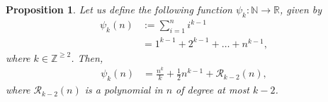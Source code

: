 \documentclass[11pt,lettersize,reqno,fullpage]{amsart}
\newtheorem{prp}[thm]{Proposition}
\begin{document}
\begin{prp}
\label{psi_k}
Let us define the following function
$\psi_k: \mathbb{N}\longrightarrow \mathbb{R}$, given by   
\begin{align} 
\psi_k(n)&:= \sum_{i=1}^{n} i^{k-1} \nonumber \\ 
          & = 1^{k-1} + 2^{k-1} + \ldots + n^{k-1},   
\end{align} 
where $k \in \mathbb{Z}^{\geq 2}$. Then, 
\begin{align} 
\psi_k(n)& = \frac{n^k}{k} + \frac{1}{2} n^{k-1} + \mathcal{R}_{k-2}(n), \label{nk_error_sharp}
\end{align}
where $\mathcal{R}_{k-2}(n)$ is a polynomial in $n$ of degree at most $k-2$. 
\end{prp}
\end{document}
